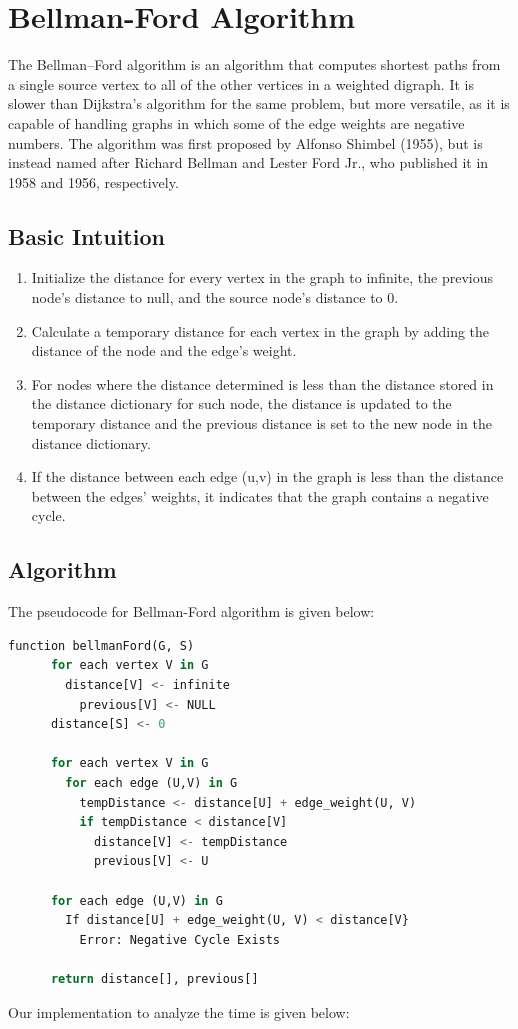 \documentclass[a4paper, 12pt]{report}
\begin{document}
    \pagebreak
    \section{Bellman-Ford Algorithm} 
	The Bellman–Ford algorithm is an algorithm that computes shortest paths from a single source vertex to all of the other vertices in a weighted digraph. It is slower than Dijkstra's algorithm for the same problem, but more versatile, as it is capable of handling graphs in which some of the edge weights are negative numbers. The algorithm was first proposed by Alfonso Shimbel (1955), but is instead named after Richard Bellman and Lester Ford Jr., who published it in 1958 and 1956, respectively.
	
	\subsection{Basic Intuition}
	\begin{enumerate}
	    \item Initialize the distance for every vertex in the graph to infinite, the previous node's distance to null, and the source node's distance to 0.
	    \item Calculate a temporary distance for each vertex in the graph by adding the distance of the node and the edge's weight.
	    \item For nodes where the distance determined is less than the distance stored in the distance dictionary for such node, the distance is updated to the temporary distance and the previous distance is set to the new node in the distance dictionary.
	    \item If the distance between each edge (u,v) in the graph is less than the distance between the edges' weights, it indicates that the graph contains a negative cycle.
	\end{enumerate}
	
	\subsection{Algorithm}
	The pseudocode for Bellman-Ford algorithm is given below: \cite{Bellman-Ford} 
	\begin{lstlisting}[language=Python]
    function bellmanFord(G, S)
      for each vertex V in G
        distance[V] <- infinite
          previous[V] <- NULL
      distance[S] <- 0
    
      for each vertex V in G				
        for each edge (U,V) in G
          tempDistance <- distance[U] + edge_weight(U, V)
          if tempDistance < distance[V]
            distance[V] <- tempDistance
            previous[V] <- U
    
      for each edge (U,V) in G
        If distance[U] + edge_weight(U, V) < distance[V}
          Error: Negative Cycle Exists
    
      return distance[], previous[]
    \end{lstlisting}
    Our implementation to analyze the time is given below: 
    
\end{document}
